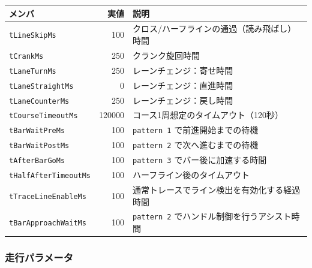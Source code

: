 \documentclass[a4paper,11pt,dvipdfmx]{jsarticle}
\begin{document}
\begin{tabularx}{\textwidth}{l r X}
\toprule
\textbf{メンバ} & \textbf{実値} & \textbf{説明} \\
\midrule
\texttt{tLineSkipMs}         & 100    & クロス/ハーフラインの通過（読み飛ばし）時間 \\
\texttt{tCrankMs}            & 250    & クランク旋回時間 \\
\texttt{tLaneTurnMs}         & 250    & レーンチェンジ：寄せ時間 \\
\texttt{tLaneStraightMs}     & 0      & レーンチェンジ：直進時間 \\
\texttt{tLaneCounterMs}      & 250    & レーンチェンジ：戻し時間 \\
\texttt{tCourseTimeoutMs}    & 120000 & コース1周想定のタイムアウト（120秒） \\
\texttt{tBarWaitPreMs}       & 100    & \texttt{pattern 1} で前進開始までの待機 \\
\texttt{tBarWaitPostMs}      & 100    & \texttt{pattern 2} で次へ進むまでの待機 \\
\texttt{tAfterBarGoMs}       & 100    & \texttt{pattern 3} でバー後に加速する時間 \\
\texttt{tHalfAfterTimeoutMs} & 100    & ハーフライン後のタイムアウト \\
\texttt{tTraceLineEnableMs}  & 100    & 通常トレースでライン検出を有効化する経過時間 \\
\texttt{tBarApproachWaitMs}  & 100    & \texttt{pattern 2} でハンドル制御を行うアシスト時間 \\
\bottomrule
\end{tabularx}

\subsubsection{走行パラメータ}
\end{document}
